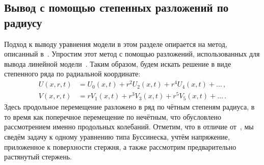 \documentclass[12pt, a4paper]{report}
\newcommand{\pdiff}[2]{\frac{\partial #1}{\partial #2}}
\begin{document}
\subsection{Вывод с помощью степенных разложений по радиусу}
Подход к выводу уравнения модели в этом разделе опирается на метод, описанный в~\cite{DF}. Упростим этот метод с помощью разложений, использованных для вывода линейной модели~\cite{bostrm2000}. Таким образом, будем искать решение в виде степенного ряда по радиальной координате:
\begin{align}
\label{u_series}
U(x,r,t) &= U_0(x,t) + r^2 U_2(x,t) + r^4 U_4(x,t) + \dots \, ,\\
\label{v_series}
V(x,r,t) &= r V_1(x,t) + r^3 V_3(x,t) + r^5 V_5(x,t) + \dots \, .
\end{align}
Здесь продольное перемещение разложено в ряд по чётным степеням радиуса, в то время как поперечное перемещение по нечётным, что обусловлено рассмотрением именно продольных колебаний. 
Отметим, что в отличие от~\cite{DF}, мы сведём задачу к одному уравнению типа Буссинеска, учтём напряжение, приложенное к поверхности стержня, а также рассмотрим предварительно растянутый стержень.
\end{document}
